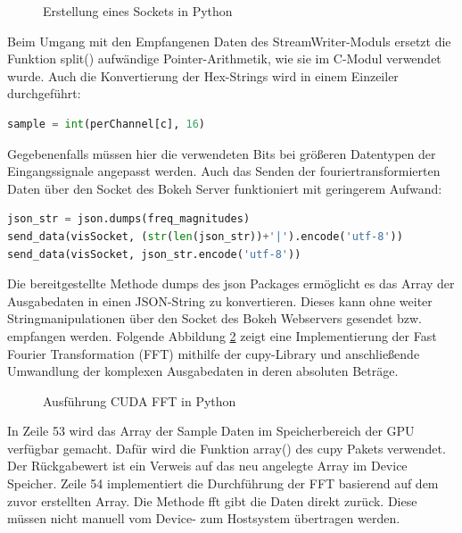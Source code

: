 \begin{figure}[h!]
	
	\caption{Erstellung eines Sockets in Python}
	\label{fig:pySocket}
\end{figure}

Beim Umgang mit den Empfangenen Daten des StreamWriter-Moduls ersetzt die Funktion split() aufwändige Pointer-Arithmetik, wie sie im C-Modul verwendet wurde. Auch die Konvertierung der Hex-Strings wird in einem Einzeiler durchgeführt:
\begin{lstlisting}[language=Python, frame=none]
	sample = int(perChannel[c], 16)
\end{lstlisting}
Gegebenenfalls müssen hier die verwendeten Bits bei größeren Datentypen der Eingangssignale angepasst werden. Auch das Senden der fouriertransformierten Daten über den Socket des Bokeh Server funktioniert mit geringerem Aufwand:

\begin{lstlisting}[language=Python, frame=none]
json_str = json.dumps(freq_magnitudes)
send_data(visSocket, (str(len(json_str))+'|').encode('utf-8'))
send_data(visSocket, json_str.encode('utf-8'))
\end{lstlisting}

Die bereitgestellte Methode dumps des json Packages ermöglicht es das Array der Ausgabedaten in einen JSON-String zu konvertieren. Dieses kann ohne weiter Stringmanipulationen über den Socket des Bokeh Webservers gesendet bzw. empfangen werden.
Folgende Abbildung \ref{fig:fftpy} zeigt eine Implementierung der Fast Fourier Transformation (FFT) mithilfe der cupy-Library und anschließende Umwandlung der komplexen Ausgabedaten in deren absoluten Beträge.

\begin{figure}[h!]
	
	\caption{Ausführung CUDA FFT in Python}
	\label{fig:fftpy}
\end{figure}

\newpage
In Zeile 53 wird das Array der Sample Daten im Speicherbereich der GPU verfügbar gemacht. Dafür wird die Funktion array() des cupy Pakets verwendet. Der Rückgabewert ist ein Verweis auf das neu angelegte Array im Device Speicher. Zeile 54 implementiert die Durchführung der FFT basierend auf dem zuvor erstellten Array. Die Methode fft gibt die Daten direkt zurück. Diese müssen nicht manuell vom Device- zum Hostsystem übertragen werden.

